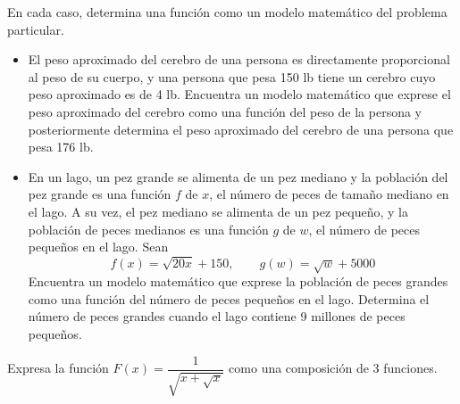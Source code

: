 \documentclass[10pt]{exam}
\begin{document}
\begin{questions}
    \question En cada caso, determina una función como un modelo matemático del problema particular.
    \begin{itemize}
        \item El peso aproximado del cerebro de una persona es directamente proporcional al peso de su cuerpo, y una persona que pesa 150 lb tiene un cerebro cuyo peso aproximado es de 4 lb. Encuentra un modelo matemático que exprese el peso aproximado del cerebro como una función del peso de la persona y posteriormente determina el peso aproximado del cerebro de una persona que pesa 176 lb. 
        \item En un lago, un pez grande se alimenta de un pez mediano y la población del pez grande es una función $f$ de $x$, el número de peces de tamaño mediano en el lago. A su vez, el pez mediano se alimenta de un pez pequeño, y la población de peces medianos es una función $g$ de $w$, el número de peces pequeños en el lago. Sean $$f(x)=\sqrt{20x}+150, \quad \quad g(w)=\sqrt{w}+5000$$
        Encuentra un modelo matemático que exprese la población de peces grandes como una función del número de peces pequeños en el lago. Determina el número de peces grandes cuando el lago contiene 9 millones de peces pequeños.
    \end{itemize}

    \question Expresa la función $F(x)=\dfrac{1}{\sqrt{x+\sqrt{x}}}$ como una composición de 3 funciones.
    
    \end{questions}



\pagestyle{foot}    %



\end{document}
